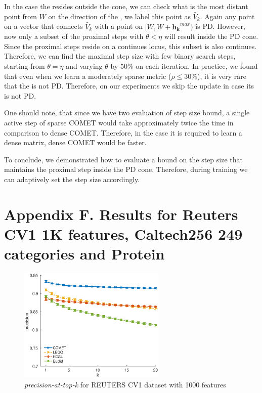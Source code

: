 \documentclass[twoside,11pt]{article}
\newcommand\mat[1]{{#1}}
\renewcommand\vec[1]{\mathbf{#1}}
\newcommand{\W}{\mat{W}}
\newcommand{\hk}{\vec{h_k}}
\newcommand{\Vk}{\mat{V_k}}
\begin{document}
In the case the \Vkorigin resides outside the cone, we can check what is the most distant point from $\W$ on the direction of the \Vkorigin, we label this point as $\widetilde{\Vk}$. Again any point on a vector that connects $\widetilde{\Vk}$ with a point on $[\W, \W + \hk^{max})$ is PD. However, now only a subset of the proximal steps with $\theta < \eta$ will result inside the PD cone. Since the proximal steps reside on a continues locus, this subset is also continues. Therefore, we can find the maximal step size with few binary search steps, starting from $\theta = \eta$ and varying $\theta$ by 50\% on each iteration. In practice, we found that even when we learn a moderately sparse metric ($\rho \leq 30\%$), it is very rare that the \Vkorigin is not PD. Therefore, on our experiments we skip the update in case its \Vkorigin is not PD.

One should note, that since we have two evaluation of step size bound, a single active step of sparse COMET would take approximately twice the time in comparison to dense COMET. Therefore, in the case it is required to learn a dense matrix, dense COMET would be faster.

To conclude, we demonstrated how to evaluate a bound on the step size that maintains the proximal step inside the PD cone. Therefore, during training we can adaptively set the step size accordingly. 

\section*{Appendix F. Results for Reuters CV1 1K features, Caltech256 249 categories and Protein}

\begin{figure}[h]
\centering
\includegraphics[width=7cm]{precision@k_rcv1_4_ig1000}
\captionsetup{font=small}
\caption*{\textit{precision-at-top-k} for REUTERS CV1 dataset with 1000 features}

\end{figure}
\end{document}
